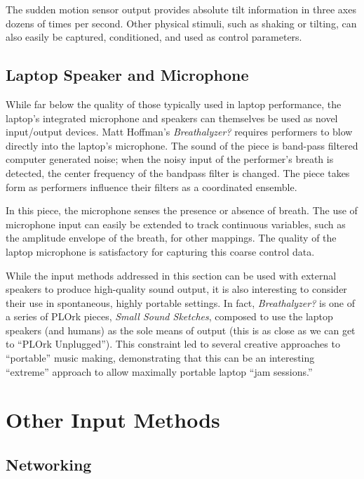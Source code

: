 The sudden motion sensor output provides absolute tilt information in three axes
dozens of times per second. Other physical stimuli, such as shaking or tilting,
can also easily be captured, conditioned, and used as control parameters.

\subsection{Laptop Speaker and Microphone}

While far below the quality of those typically used in laptop performance, the
laptop's integrated microphone and speakers can themselves be used as novel
input/output devices. Matt Hoffman's \textit{Breathalyzer?} requires performers
to blow directly into the laptop's microphone. The sound of the piece is
band-pass filtered computer generated noise; when the noisy input of the
performer's breath is detected, the center frequency of the bandpass filter is
changed. The piece takes form as performers influence their filters as a
coordinated ensemble.

In this piece, the microphone senses the presence or absence of breath. The use
of microphone input can easily be extended to track continuous variables, such as
the amplitude envelope of the breath, for other mappings. The quality of the
laptop microphone is satisfactory for capturing this coarse control data.

While the input methods addressed in this section can be used with external
speakers to produce high-quality sound output, it is also interesting to consider
their use in spontaneous, highly portable settings. In fact,
\textit{Breathalyzer?} is one of a series of PLOrk pieces, \textit{Small Sound
Sketches}, composed to use the laptop speakers (and humans) as the sole means of
output (this is as close as we can get to ``PLOrk Unplugged''). This constraint
led to several creative approaches to ``portable'' music making, demonstrating
that this can be an interesting ``extreme'' approach to allow maximally portable
laptop ``jam sessions.''

\section{Other Input Methods}

\subsection{Networking}

